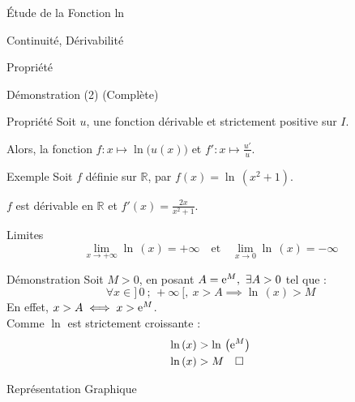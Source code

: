\documentclass{cours}
\begin{document}
\begin{Gpartie}{Étude de la Fonction ln}
\begin{Spartie}{Continuité, Dérivabilité}
\begin{SSpartie}{Propriété}
\begin{SSSpartie}{Démonstration (2) (Complète)}
                \end{SSSpartie}
            \end{SSpartie}
            \begin{SSpartie}{Propriété}
                Soit $u$, une fonction dérivable et strictement positive sur $I$.

                Alors, la fonction $f:x\mapsto\ln\big(u(x)\big)$ et $\boxed{f':x\mapsto\frac{u'}{u}}$.
                \begin{SSSpartie}{Exemple}
                    Soit $f$ définie sur $\mathbb{R}$, par $f(x)=\ln\,(x^2+1)$.

                    $f$ est dérivable en $\mathbb{R}$ et $f'(x)=\frac{2x}{x^2+1}$.
                \end{SSSpartie}
            \end{SSpartie}
        \end{Spartie}
        \begin{Spartie}{Limites}
            \[\boxed{\lim_{x\to+\infty}\ln\,(x)=+\infty\quad\text{et}\quad\lim_{x\to 0}\ln\,(x)=-\infty}\]
            \begin{SSpartie}{Démonstration} 
                Soit $M>0$, en posant $A=\mathrm{e}^M,~\exists A>0$ tel que :
                \[\forall x\in\big]\,0~;\,+\infty~\big[,~x>A\implies\ln\,(x)>M\]
                En effet, $x>A\iff x>\mathrm{e}^M$. \\ Comme $\ln$ est strictement croissante :
                \[\begin{aligned}[t]
                    \ln\,(x)&>\ln\,\left(\mathrm{e}^M\right) \\
                    \ln\,(x)&>M\quad\square
                \end{aligned}\]
            \end{SSpartie}
        \end{Spartie}
        \begin{Spartie}{Représentation Graphique}
            \begin{center}
                \parbox{\linewidth}{}
            \end{center}
        \end{Spartie}
    \end{Gpartie}
\end{document}
